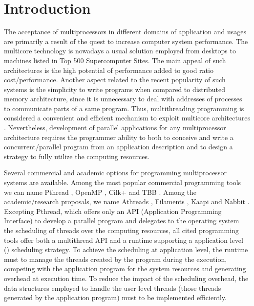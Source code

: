 \documentclass{sig-alternate}
\begin{document}



\section{Introduction}

The acceptance of multiprocessors in different domains of application
and usages are primarily a result of the quest to increase computer
system performance. The multicore technology is nowadays a usual
solution employed from desktops to machines listed in Top 500
Supercomputer Sites. The main appeal of such architectures is the high
potential of performance added to good ratio cost/performance. Another
aspect related to the recent popularity of such systems is the
simplicity to write programs when compared to distributed memory
architecture, since it is unnecessary to deal with addresses of
processes to communicate parts of a same program. Thus, multithreading
programming is considered a convenient and efficient mechanism to
exploit multicore architectures \cite{Sodan05, mei:2010}. Nevertheless,
development of parallel applications for any multiprocessor
architecture requires the programmer ability to both to conceive and
write a concurrent/parallel program from an application description
and to design a strategy to fully utilize the computing resources.

Several commercial and academic options for programming multiprocessor
systems are available. Among the most popular commercial programming
tools we can name Pthread \cite{NicholsPthreads}, OpenMP \cite{ChandraOpenMP}, Cilk+
\cite{IntelCilkPlus} and TBB \cite{TBB2007}. Among the academic/research proposals,
we name Athreads \cite{VecParLNCS}, Filaments \cite{Filaments94}, Kaapi \cite{kaapi2007}
and Nabbit \cite{Nabbit2010}. Excepting  Pthread, which offers only an API
(Application Programming Interface) to develop a parallel program and
delegates to the operating system the scheduling of threads over the
computing resources, all cited programming tools offer both a
multithread API and a runtime supporting  a application level
(\cite{feitelson1997job}) scheduling strategy. To achieve the scheduling at
application level, the runtime must to manage the threads created by
the program during the execution, competing with the application
program for the system resources and generating overhead at execution
time. To reduce the impact of the scheduling overhead, the data
structures employed to handle the user level threads (those threads
generated by the application program) must to be implemented
efficiently.
\end{document}
